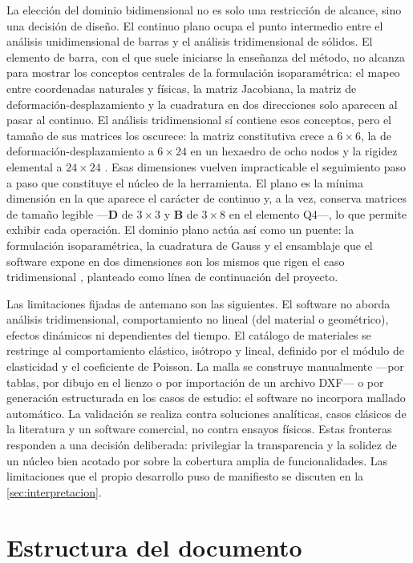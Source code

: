 La elección del dominio bidimensional no es solo una restricción de alcance, sino una decisión de diseño. El continuo plano ocupa el punto intermedio entre el análisis unidimensional de barras y el análisis tridimensional de sólidos. El elemento de barra, con el que suele iniciarse la enseñanza del método, no alcanza para mostrar los conceptos centrales de la formulación isoparamétrica: el mapeo entre coordenadas naturales y físicas, la matriz Jacobiana, la matriz de deformación-desplazamiento y la cuadratura en dos direcciones solo aparecen al pasar al continuo. El análisis tridimensional sí contiene esos conceptos, pero el tamaño de sus matrices los oscurece: la matriz constitutiva crece a $6\times6$, la de deformación-desplazamiento a $6\times24$ en un hexaedro de ocho nodos y la rigidez elemental a $24\times24$ \autocite[p.~218]{cook2002concepts}. Esas dimensiones vuelven impracticable el seguimiento paso a paso que constituye el núcleo de la herramienta. El plano es la mínima dimensión en la que aparece el carácter de continuo y, a la vez, conserva matrices de tamaño legible —$\bm{D}$ de $3\times3$ y $\bm{B}$ de $3\times8$ en el elemento Q4—, lo que permite exhibir cada operación. El dominio plano actúa así como un puente: la formulación isoparamétrica, la cuadratura de Gauss y el ensamblaje que el software expone en dos dimensiones son los mismos que rigen el caso tridimensional \autocite{bathe2014fem,zienkiewicz2013fem}, planteado como línea de continuación del proyecto.

Las limitaciones fijadas de antemano son las siguientes. El software no aborda análisis tridimensional, comportamiento no lineal (del material o geométrico), efectos dinámicos ni dependientes del tiempo. El catálogo de materiales se restringe al comportamiento elástico, isótropo y lineal, definido por el módulo de elasticidad y el coeficiente de Poisson. La malla se construye manualmente —por tablas, por dibujo en el lienzo o por importación de un archivo DXF— o por generación estructurada en los casos de estudio: el software no incorpora mallado automático. La validación se realiza contra soluciones analíticas, casos clásicos de la literatura y un software comercial, no contra ensayos físicos. Estas fronteras responden a una decisión deliberada: privilegiar la transparencia y la solidez de un núcleo bien acotado por sobre la cobertura amplia de funcionalidades. Las limitaciones que el propio desarrollo puso de manifiesto se discuten en la \autoref{sec:interpretacion}.

\section*{Estructura del documento}

